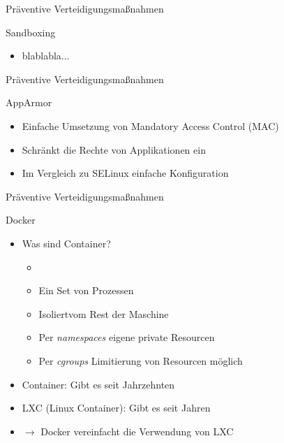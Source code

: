 \begin{frame}{Präventive Verteidigungsmaßnahmen}
        \begin{block}{Sandboxing}
                \begin{itemize}
                        \item blablabla... 
                \end{itemize}
        \end{block}
\end{frame}

\begin{frame}{Präventive Verteidigungsmaßnahmen}
        \begin{block}{AppArmor}
                \begin{itemize}
                        \item Einfache Umsetzung von Mandatory Access Control (MAC)
                        \pause
                        \item Schränkt die Rechte von Applikationen ein
                        \pause
                        \item Im Vergleich zu SELinux einfache Konfiguration
                \end{itemize}
        \end{block}
\end{frame}

\begin{frame}{Präventive Verteidigungsmaßnahmen}
        \begin{block}{Docker}
                \begin{itemize}
                        \item Was sind Container?
                        \begin{itemize}
                                \item \textbf{}
                                \item Ein Set von Prozessen
                                \item Isoliert\footnotemark vom Rest der Maschine
                                \item Per \textit{namespaces} eigene private Resourcen
                                \item Per \textit{cgroups} Limitierung von Resourcen möglich
                        \end{itemize}
                        \item Container: Gibt es seit Jahrzehnten
                        \item LXC (Linux Container): Gibt es seit Jahren
                        \item $\rightarrow$ Docker vereinfacht die Verwendung von LXC 
                \end{itemize}
        \end{block}

\end{frame}

